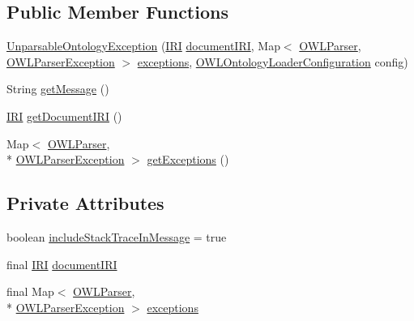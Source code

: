 \subsection*{Public Member Functions}
\begin{DoxyCompactItemize}
\item 
\hyperlink{classorg_1_1semanticweb_1_1owlapi_1_1io_1_1_unparsable_ontology_exception_a5214aeddce77d60d827eeb3d868f464d}{Unparsable\-Ontology\-Exception} (\hyperlink{classorg_1_1semanticweb_1_1owlapi_1_1model_1_1_i_r_i}{I\-R\-I} \hyperlink{classorg_1_1semanticweb_1_1owlapi_1_1io_1_1_unparsable_ontology_exception_acd973ced45ef51c3d2ee575e4e3b2951}{document\-I\-R\-I}, Map$<$ \hyperlink{interfaceorg_1_1semanticweb_1_1owlapi_1_1io_1_1_o_w_l_parser}{O\-W\-L\-Parser}, \hyperlink{classorg_1_1semanticweb_1_1owlapi_1_1io_1_1_o_w_l_parser_exception}{O\-W\-L\-Parser\-Exception} $>$ \hyperlink{classorg_1_1semanticweb_1_1owlapi_1_1io_1_1_unparsable_ontology_exception_adb6847e3a63902978beb1759d75f7d5d}{exceptions}, \hyperlink{classorg_1_1semanticweb_1_1owlapi_1_1model_1_1_o_w_l_ontology_loader_configuration}{O\-W\-L\-Ontology\-Loader\-Configuration} config)
\item 
String \hyperlink{classorg_1_1semanticweb_1_1owlapi_1_1io_1_1_unparsable_ontology_exception_aaf3dc38ebf3746df37d8b281550d83bd}{get\-Message} ()
\item 
\hyperlink{classorg_1_1semanticweb_1_1owlapi_1_1model_1_1_i_r_i}{I\-R\-I} \hyperlink{classorg_1_1semanticweb_1_1owlapi_1_1io_1_1_unparsable_ontology_exception_ad61fc517ce3539f32a11a682382e3813}{get\-Document\-I\-R\-I} ()
\item 
Map$<$ \hyperlink{interfaceorg_1_1semanticweb_1_1owlapi_1_1io_1_1_o_w_l_parser}{O\-W\-L\-Parser}, \\*
\hyperlink{classorg_1_1semanticweb_1_1owlapi_1_1io_1_1_o_w_l_parser_exception}{O\-W\-L\-Parser\-Exception} $>$ \hyperlink{classorg_1_1semanticweb_1_1owlapi_1_1io_1_1_unparsable_ontology_exception_a616c05d42175f9a2ab8b2689a207d7f9}{get\-Exceptions} ()
\end{DoxyCompactItemize}
\subsection*{Private Attributes}
\begin{DoxyCompactItemize}
\item 
boolean \hyperlink{classorg_1_1semanticweb_1_1owlapi_1_1io_1_1_unparsable_ontology_exception_a9b666fca507687bf7b4e171d88b7dd4a}{include\-Stack\-Trace\-In\-Message} = true
\item 
final \hyperlink{classorg_1_1semanticweb_1_1owlapi_1_1model_1_1_i_r_i}{I\-R\-I} \hyperlink{classorg_1_1semanticweb_1_1owlapi_1_1io_1_1_unparsable_ontology_exception_acd973ced45ef51c3d2ee575e4e3b2951}{document\-I\-R\-I}
\item 
final Map$<$ \hyperlink{interfaceorg_1_1semanticweb_1_1owlapi_1_1io_1_1_o_w_l_parser}{O\-W\-L\-Parser}, \\*
\hyperlink{classorg_1_1semanticweb_1_1owlapi_1_1io_1_1_o_w_l_parser_exception}{O\-W\-L\-Parser\-Exception} $>$ \hyperlink{classorg_1_1semanticweb_1_1owlapi_1_1io_1_1_unparsable_ontology_exception_adb6847e3a63902978beb1759d75f7d5d}{exceptions}
\end{DoxyCompactItemize}
